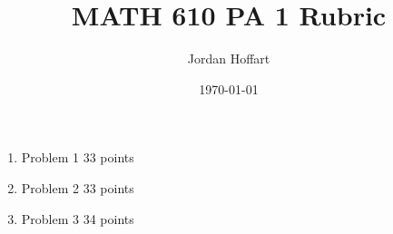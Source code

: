 \documentclass{article}
\title{MATH 610 PA 1 Rubric}
\author{Jordan Hoffart}
\date{\today}
\begin{document}
\maketitle

\begin{enumerate}
	\item Problem 1 33 points
	\item Problem 2 33 points
	\item Problem 3 34 points
\end{enumerate}
\end{document}
